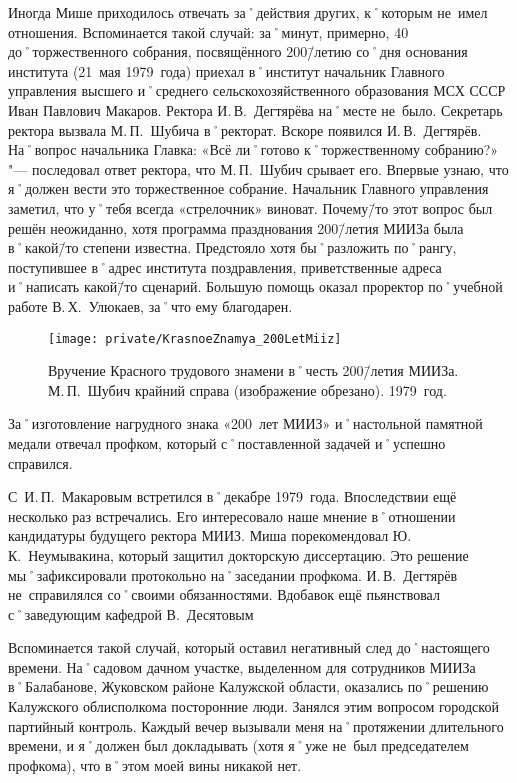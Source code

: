 Иногда Мише приходилось отвечать за˚действия других, к˚которым не~имел отношения. Вспоминается такой случай: за˚минут, примерно, 40 до˚торжественного собрания, посвящённого 200\=/летию со˚дня основания института (21~мая 1979~года) приехал в˚институт начальник Главного управления высшего и˚среднего сельскохозяйственного образования МСХ СССР Иван Павлович Макаров. Ректора И.\,В.~Дегтярёва на˚месте не~было. Секретарь ректора вызвала М.\,П.~Шубича в˚ректорат. Вскоре появился И.\,В.~Дегтярёв. На˚вопрос начальника Главка: «Всё ли˚готово к˚торжественному собранию?» "--- последовал ответ ректора, что М.\,П.~Шубич срывает его. Впервые узнаю, что я˚должен вести это торжественное собрание. Начальник Главного управления заметил, что у˚тебя всегда «стрелочник» виноват. Почему\=/то этот вопрос был решён неожиданно, хотя программа празднования 200\=/летия МИИЗа была в˚какой\=/то степени известна. Предстояло хотя бы˚разложить по˚рангу, поступившее в˚адрес института поздравления, приветственные адреса и˚написать какой\=/то сценарий. Большую помощь оказал проректор по˚учебной работе В.\,Х.~Улюкаев, за˚что ему благодарен.

\begin{figure}[h]
\texttt{[image: private/KrasnoeZnamya\_200LetMiiz]}
\caption{Вручение Красного трудового знамени в˚честь 200\=/летия МИИЗа. М.\,П.~Шубич крайний справа (изображение обрезано). 1979~год.}
\label{fig:KrasnoeZnamya_200LetMiiz}
\end{figure}

За˚изготовление нагрудного знака «200~лет МИИЗ» и˚настольной памятной медали отвечал профком, который с˚поставленной задачей и˚успешно справился.

С~И.\,П.~Макаровым встретился в˚декабре 1979~года. Впоследствии ещё несколько раз встречались. Его интересовало наше мнение в˚отношении кандидатуры будущего ректора МИИЗ. Миша порекомендовал Ю.\,К.~Неумывакина, который защитил докторскую диссертацию. Это решение мы˚зафиксировали протокольно на˚заседании профкома. И.\,В.~Дегтярёв не~справилялся со˚своими обязанностями. Вдобавок ещё пьянствовал с˚заведующим кафедрой В.~Десятовым

Вспоминается такой случай, который оставил негативный след до˚настоящего времени. На˚садовом дачном участке, выделенном для сотрудников МИИЗа в˚Балабанове, Жуковском районе Калужской области, оказались по˚решению Калужского облисполкома посторонние люди. Занялся этим вопросом городской партийный контроль. Каждый вечер вызывали меня на˚протяжении длительного времени, и я˚должен был докладывать (хотя я˚уже не~был председателем профкома), что в˚этом моей вины никакой нет.

